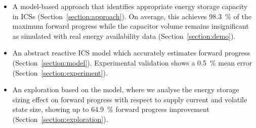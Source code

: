 \begin{itemize}
    \item A model-based approach that identifies appropriate energy storage capacity in ICSs (Section~\ref{section:approach}). On average, this achieves \SI{98.3}{\percent} of the maximum forward progress while the capacitor volume remains insignificant as simulated with real energy availability data (Section~\ref{section:demo}). 
    \item An abstract reactive ICS model which accurately estimates forward progress (Section~\ref{section:model}). Experimental validation shows a \SI{0.5}{\percent} mean error (Section~\ref{section:experiment}).
    \item An exploration based on the model, where we analyse the energy storage sizing effect on forward progress with respect to supply current and volatile state size, showing up to \SI{64.9}{\percent} forward progress improvement (Section~\ref{section:exploration}). 


    

\end{itemize}

